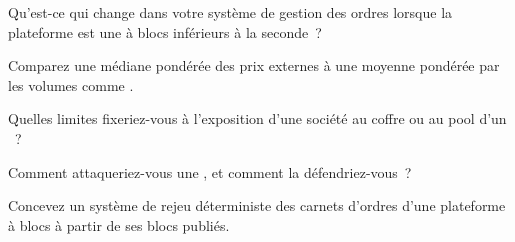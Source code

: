 \begin{interviewq}\label{iq:m3:on-chain-order-books-and-perpetual-dexs:2}
Qu'est-ce qui change dans votre système de gestion des ordres lorsque la plateforme est une  à blocs inférieurs à la seconde~?
\end{interviewq}

\begin{interviewq}\label{iq:m3:on-chain-order-books-and-perpetual-dexs:3}
Comparez une médiane pondérée des prix externes à une moyenne pondérée par les volumes comme .
\end{interviewq}

\begin{interviewq}\label{iq:m3:on-chain-order-books-and-perpetual-dexs:4}
Quelles limites fixeriez-vous à l'exposition d'une société au coffre ou au pool d'un ~?
\end{interviewq}

\begin{interviewq}\label{iq:m3:on-chain-order-books-and-perpetual-dexs:5}
Comment attaqueriez-vous une , et comment la défendriez-vous~?
\end{interviewq}

\begin{interviewq}\label{iq:m3:on-chain-order-books-and-perpetual-dexs:6}
Concevez un système de rejeu déterministe des carnets d'ordres d'une plateforme à blocs à partir de ses blocs publiés.
\end{interviewq}
